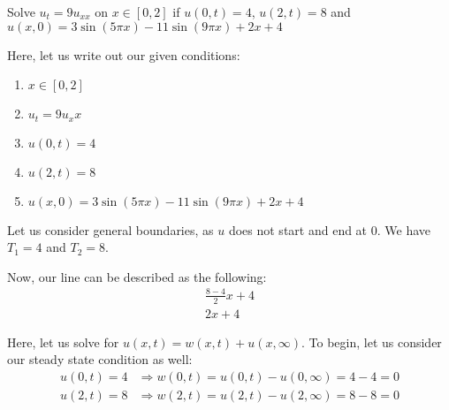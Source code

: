 \item Solve $u_t = 9u_{xx}$ on $x \in [0, 2]$ if $u(0, t) = 4$, $u(2, t) = 8$ and $u(x, 0) = 3 \sin(5 \pi x) - 11 \sin(9 \pi x) + 2x + 4$

Here, let us write out our given conditions:
\begin{enumerate}
  \item $x \in [0, 2]$
  \item $u_t = 9u_xx$
  \item $u(0, t) = 4$
  \item $u(2, t) = 8$
  \item $u(x, 0) = 3\sin(5 \pi x) - 11\sin(9 \pi x) + 2x + 4$
\end{enumerate}

Let us consider general boundaries, as $u$ does not start and end at $0$. We have $T_1 = 4$ and $T_2 = 8$.

Now, our line can be described as the following:
%
\begin{align}
  \frac{8 - 4}{2}x + 4\\
  2x + 4
\end{align}

Here, let us solve for $u(x, t) = w(x, t) + u(x, \infty)$. To begin, let us consider our steady state condition as well:
%
\begin{align}
  u(0, t) = 4 & \Rightarrow w(0, t) = u(0, t) - u(0, \infty) = 4 - 4 = 0\\
  u(2, t) = 8 & \Rightarrow w(2, t) = u(2, t) - u(2, \infty) = 8 - 8 = 0
\end{align}

